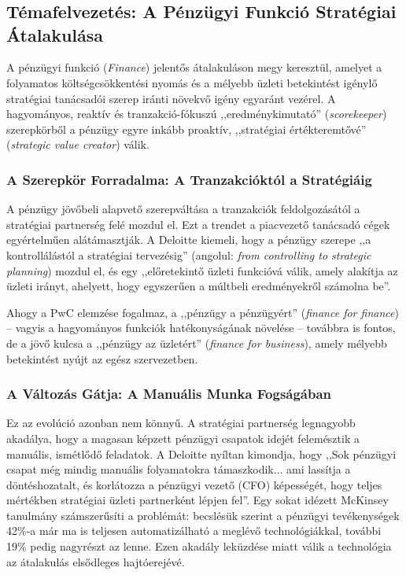 
\chapter{\bevezetes}
\label{chap:bevezetes}


\section{Témafelvezetés: A Pénzügyi Funkció Stratégiai Átalakulása}
\label{sec:temafelvetes}

A pénzügyi funkció (\textit{Finance}) jelentős átalakuláson megy keresztül, amelyet a folyamatos költségcsökkentési nyomás és a mélyebb üzleti betekintést igénylő stratégiai tanácsadói szerep iránti növekvő igény egyaránt vezérel.
A hagyományos, reaktív és tranzakció-fókuszú ,,eredménykimutató'' (\textit{scorekeeper}) szerepkörből a pénzügy egyre inkább proaktív, ,,stratégiai értékteremtővé'' (\textit{strategic value creator}) válik.


\subsection{A Szerepkör Forradalma: A Tranzakcióktól a Stratégiáig}
\label{ssec:szerepkor_forradalma}

A pénzügy jövőbeli alapvető szerepváltása a tranzakciók feldolgozásától a stratégiai partnerség felé mozdul el.
Ezt a trendet a piacvezető tanácsadó cégek egyértelműen alátámasztják. A Deloitte kiemeli, hogy a pénzügy szerepe ,,a kontrollálástól a stratégiai tervezésig'' (angolul: \textit{from controlling to strategic planning}) mozdul el, és egy ,,előretekintő üzleti funkcióvá válik, amely alakítja az üzleti irányt, ahelyett, hogy egyszerűen a múltbeli eredményekről számolna be''\cite{Deloitte-Controlling-Change}.

Ahogy a PwC elemzése fogalmaz, a ,,pénzügy a pénzügyért'' (\textit{finance for finance}) -- vagyis a hagyományos funkciók hatékonyságának növelése -- továbbra is fontos, de a jövő kulcsa a ,,pénzügy az üzletért'' (\textit{finance for business}), amely mélyebb betekintést nyújt az egész szervezetben\cite{PwC-Future-of-Finance}.


\subsection{A Változás Gátja: A Manuális Munka Fogságában}
\label{ssec:valtozas_gatja}

Ez az evolúció azonban nem könnyű.
A stratégiai partnerség legnagyobb akadálya, hogy a magasan képzett pénzügyi csapatok idejét felemésztik a manuális, ismétlődő feladatok.
A Deloitte nyíltan kimondja, hogy ,,Sok pénzügyi csapat még mindig manuális folyamatokra támaszkodik... ami lassítja a döntéshozatalt, és korlátozza a pénzügyi vezető (CFO) képességét, hogy teljes mértékben stratégiai üzleti partnerként lépjen fel''\cite{Deloitte-Finance-2025}. Egy sokat idézett McKinsey tanulmány számszerűsíti a problémát: becslésük szerint a pénzügyi tevékenységek 42\%-a már ma is teljesen automatizálható a meglévő technológiákkal, további 19\% pedig nagyrészt az lenne\cite{McKinsey-Future-of-Finance}.
Ezen akadály leküzdése miatt válik a technológia az átalakulás elsődleges hajtóerejévé.


